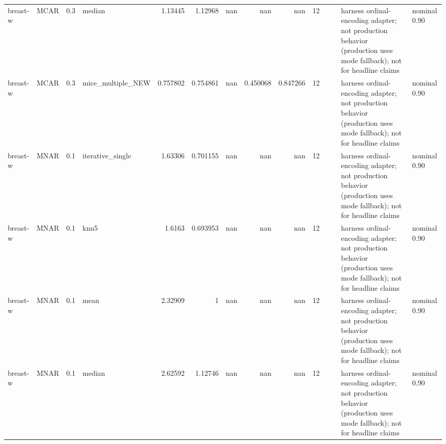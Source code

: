 \begin{table}[ht]
\begin{tabular}{llrlrrrrrrllll}
 breast-w             & MCAR        &         0.3 & median            &       1.13445  &             1.12968  &               nan        &                     nan        &                       nan        &        12 &                    &                                         & harness ordinal-encoding adapter; not production behavior (production uses mode fallback); not for headline claims & nominal 0.90              \\
 breast-w             & MCAR        &         0.3 & mice\_multiple\_NEW &       0.757802 &             0.754861 &               nan        &                       0.450068 &                         0.847266 &        12 &                    &                                         & harness ordinal-encoding adapter; not production behavior (production uses mode fallback); not for headline claims & nominal 0.90              \\
 breast-w             & MNAR        &         0.1 & iterative\_single  &       1.63306  &             0.701155 &               nan        &                     nan        &                       nan        &        12 &                    &                                         & harness ordinal-encoding adapter; not production behavior (production uses mode fallback); not for headline claims & nominal 0.90              \\
 breast-w             & MNAR        &         0.1 & knn5              &       1.6163   &             0.693953 &               nan        &                     nan        &                       nan        &        12 &                    &                                         & harness ordinal-encoding adapter; not production behavior (production uses mode fallback); not for headline claims & nominal 0.90              \\
 breast-w             & MNAR        &         0.1 & mean              &       2.32909  &             1        &               nan        &                     nan        &                       nan        &        12 &                    &                                         & harness ordinal-encoding adapter; not production behavior (production uses mode fallback); not for headline claims & nominal 0.90              \\
 breast-w             & MNAR        &         0.1 & median            &       2.62592  &             1.12746  &               nan        &                     nan        &                       nan        &        12 &                    &                                         & harness ordinal-encoding adapter; not production behavior (production uses mode fallback); not for headline claims & nominal 0.90              \\

\end{tabular}
\end{table}
